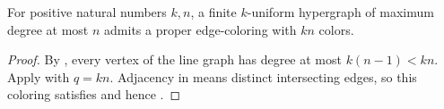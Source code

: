 \begin{lemma}
For positive natural numbers $k,n$, a finite $k$-uniform hypergraph of
maximum degree at most $n$ admits a proper edge-coloring with $kn$ colors.
\end{lemma}
\begin{proof}
By , every vertex of the line
graph has degree at most $k(n-1)<kn$.
Apply  with $q=kn$.
Adjacency in  means distinct intersecting
edges, so this coloring satisfies  and hence
.
\end{proof}
